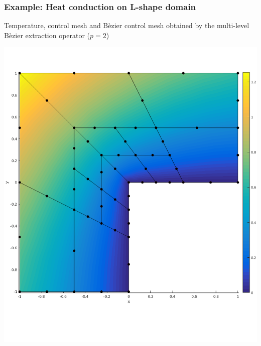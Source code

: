 \documentclass{beamer}
\begin{document}
\begin{frame}
	\frametitle{Example: Heat conduction on L-shape domain}%
	Temperature, control mesh and B\`ezier control mesh obtained by the multi-level B\`ezier extraction operator ($ p=2 $)\\
	\centering
	\begin{minipage}{0.49\textwidth}
		\centering
		\includegraphics[scale=0.24]{pics/lshape/lshape_beziernet_2.png}
	\end{minipage}
	\begin{minipage}{0.49\textwidth}
		\centering

\end{minipage}
\end{frame}
\end{document}
